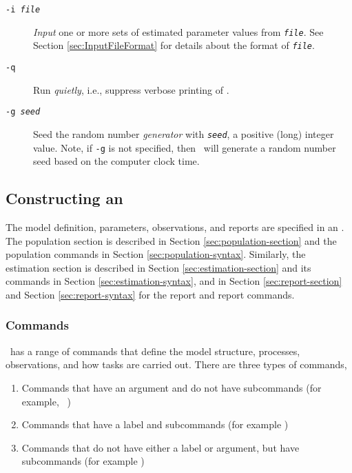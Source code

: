 \begin{description}
\item [\texttt{-i \emph{file}}] \emph{Input} one or more sets of estimated parameter values from \texttt{\emph{file}}. See Section \ref{sec:InputFileFormat} for details about the format of \texttt{\emph{file}}.


\item [\texttt{-q}] Run \emph{quietly}, i.e., suppress verbose printing of \SPM.

\item [\texttt{-g \emph{seed}}]  Seed the random number \emph{generator} with \texttt{\emph{seed}}, a positive (long) integer value. Note, if \texttt{-g} is not specified, then \SPM\ will  generate a random number seed based on the computer clock time.
\end{description}

\subsection{Constructing an \SPM\ \config \label{constructing-spm-config}}

The model definition, parameters, observations, and reports are specified in an \config. The  population section is described in Section \ref{sec:population-section} and the population commands in Section \ref{sec:population-syntax}. Similarly, the estimation section is described in Section \ref{sec:estimation-section} and its commands in Section \ref{sec:estimation-syntax}, and in Section \ref{sec:report-section} and Section \ref{sec:report-syntax} for the report and report commands. 

\subsubsection{Commands}

\SPM\ has a range of commands that define the model structure, processes, observations, and how tasks are carried out. There are three types of commands, 

\begin{enumerate}
\item Commands that have an argument and do not have subcommands (for example, \ )
\item Commands that have a label and subcommands (for example )
\item Commands that do not have either a label or argument, but have subcommands (for example )
\end{enumerate}

